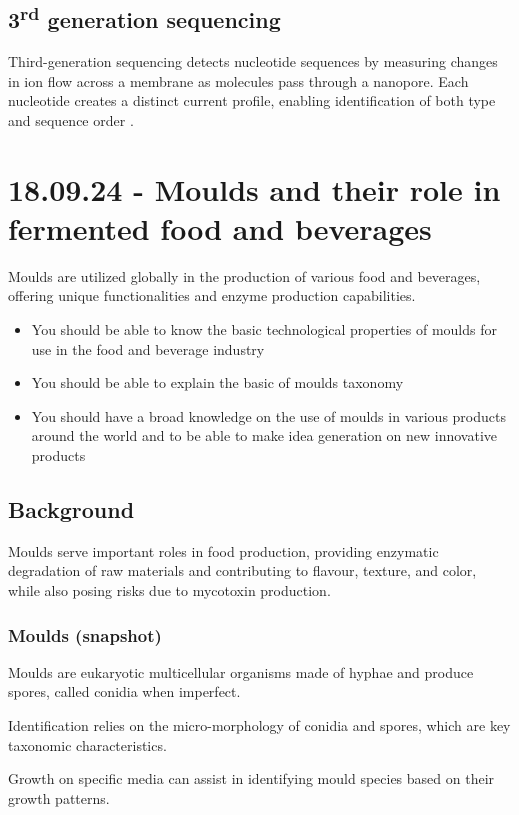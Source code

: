 \subsection{3\texorpdfstring{\textsuperscript{rd}}{rd} generation sequencing}
Third-generation sequencing detects nucleotide sequences by measuring changes in ion flow across a membrane as molecules pass through a nanopore. Each nucleotide creates a distinct current profile, enabling identification of both type and sequence order \cite*{L5-HighThroughput}.

\section{18.09.24 - Moulds and their role in fermented food and beverages}
Moulds are utilized globally in the production of various food and beverages, offering unique functionalities and enzyme production capabilities.

\begin{itemize}
    \item You should be able to know the basic technological properties of moulds for use in the food and beverage industry
    \item You should be able to explain the basic of moulds taxonomy
    \item You should have a broad knowledge on the use of moulds in various products around the world and to be able to make idea generation on new innovative products
\end{itemize}
\subsection*{Background}
Moulds serve important roles in food production, providing enzymatic degradation of raw materials and contributing to flavour, texture, and color, while also posing risks due to mycotoxin production.

\subsubsection*{Moulds (snapshot)}
Moulds are eukaryotic multicellular organisms made of hyphae and produce spores, called conidia when imperfect.

Identification relies on the micro-morphology of conidia and spores, which are key taxonomic characteristics.

Growth on specific media can assist in identifying mould species based on their growth patterns.

